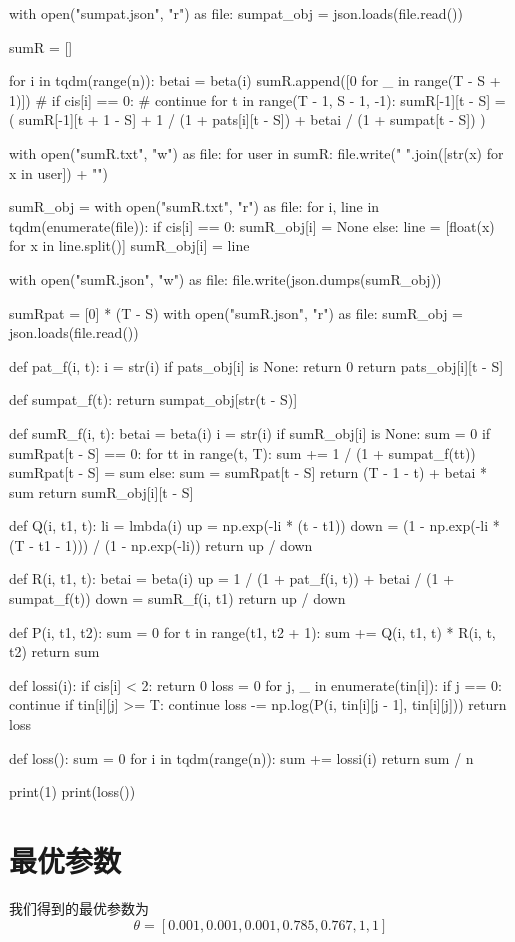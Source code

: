 \documentclass{article} %
\begin{document}
\begin{python}
with open("sumpat.json", "r") as file:
    sumpat_obj = json.loads(file.read())


sumR = []

for i in tqdm(range(n)):
    betai = beta(i)
    sumR.append([0 for _ in range(T - S + 1)])
    # if cis[i] == 0:
    #     continue
    for t in range(T - 1, S - 1, -1):
        sumR[-1][t - S] = (
            sumR[-1][t + 1 - S] + 1 / (1 + pats[i][t - S]) + betai / (1 + sumpat[t - S])
        )

with open("sumR.txt", "w") as file:
    for user in sumR:
        file.write(" ".join([str(x) for x in user]) + "\n")

sumR_obj = {}
with open("sumR.txt", "r") as file:
    for i, line in tqdm(enumerate(file)):
        if cis[i] == 0:
            sumR_obj[i] = None
        else:
            line = [float(x) for x in line.split()]
            sumR_obj[i] = line

with open("sumR.json", "w") as file:
    file.write(json.dumps(sumR_obj))

sumRpat = [0] * (T - S)
with open("sumR.json", "r") as file:
    sumR_obj = json.loads(file.read())


def pat_f(i, t):
    i = str(i)
    if pats_obj[i] is None:
        return 0
    return pats_obj[i][t - S]


def sumpat_f(t):
    return sumpat_obj[str(t - S)]


def sumR_f(i, t):
    betai = beta(i)
    i = str(i)
    if sumR_obj[i] is None:
        sum = 0
        if sumRpat[t - S] == 0:
            for tt in range(t, T):
                sum += 1 / (1 + sumpat_f(tt))
            sumRpat[t - S] = sum
        else:
            sum = sumRpat[t - S]
        return (T - 1 - t) + betai * sum
    return sumR_obj[i][t - S]


def Q(i, t1, t):
    li = lmbda(i)
    up = np.exp(-li * (t - t1))
    down = (1 - np.exp(-li * (T - t1 - 1))) / (1 - np.exp(-li))
    return up / down


def R(i, t1, t):
    betai = beta(i)
    up = 1 / (1 + pat_f(i, t)) + betai / (1 + sumpat_f(t))
    down = sumR_f(i, t1)
    return up / down


def P(i, t1, t2):
    sum = 0
    for t in range(t1, t2 + 1):
        sum += Q(i, t1, t) * R(i, t, t2)
    return sum


def lossi(i):
    if cis[i] < 2:
        return 0
    loss = 0
    for j, _ in enumerate(tin[i]):
        if j == 0:
            continue
        if tin[i][j] >= T:
            continue
        loss -= np.log(P(i, tin[i][j - 1], tin[i][j]))
    return loss


def loss():
    sum = 0
    for i in tqdm(range(n)):
        sum += lossi(i)
    return sum / n


print(1)
print(loss())

\end{python}

\section{最优参数}
我们得到的最优参数为\\
$$
\theta=[0.001, 0.001, 0.001, 0.785, 0.767, 1, 1]
$$
\end{document}
